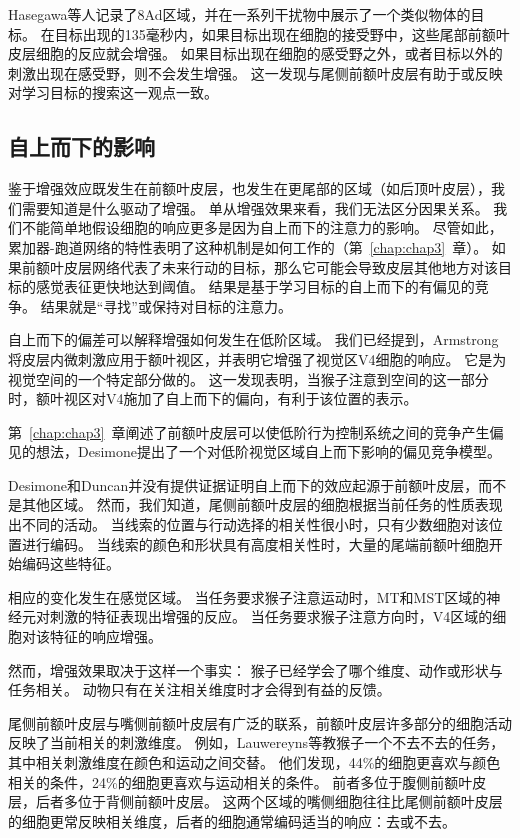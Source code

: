 Hasegawa等人\cite{hasegawa2000search}记录了8Ad区域，并在一系列干扰物中展示了一个类似物体的目标。
在目标出现的135毫秒内，如果目标出现在细胞的接受野中，这些尾部前额叶皮层细胞的反应就会增强。
如果目标出现在细胞的感受野之外，或者目标以外的刺激出现在感受野，则不会发生增强。
这一发现与尾侧前额叶皮层有助于或反映对学习目标的搜索这一观点一致。



\subsection{自上而下的影响}

鉴于增强效应既发生在前额叶皮层，也发生在更尾部的区域（如后顶叶皮层），我们需要知道是什么驱动了增强。
单从增强效果来看，我们无法区分因果关系。
我们不能简单地假设细胞的响应更多是因为自上而下的注意力的影响。
尽管如此，累加器-跑道网络的特性表明了这种机制是如何工作的（第~\ref{chap:chap3}~章）。
如果前额叶皮层网络代表了未来行动的目标，那么它可能会导致皮层其他地方对该目标的感觉表征更快地达到阈值。
结果是基于学习目标的自上而下的有偏见的竞争\cite{desimone1995neural}。
结果就是“寻找”或保持对目标的注意力。


自上而下的偏差可以解释增强如何发生在低阶区域。
我们已经提到，Armstrong\cite{armstrong2007rapid}将皮层内微刺激应用于额叶视区，并表明它增强了视觉区V4细胞的响应。
它是为视觉空间的一个特定部分做的。
这一发现表明，当猴子注意到空间的这一部分时，额叶视区对V4施加了自上而下的偏向，有利于该位置的表示。


第~\ref{chap:chap3}~章阐述了前额叶皮层可以使低阶行为控制系统之间的竞争产生偏见的想法，Desimone\cite{desimone1995neural}提出了一个对低阶视觉区域自上而下影响的偏见竞争模型。


Desimone和Duncan并没有提供证据证明自上而下的效应起源于前额叶皮层，而不是其他区域。
然而，我们知道，尾侧前额叶皮层的细胞根据当前任务的性质表现出不同的活动。
当线索的位置与行动选择的相关性很小时，只有少数细胞对该位置进行编码\cite{chen2001neuronal}。
当线索的颜色和形状具有高度相关性时，大量的尾端前额叶细胞开始编码这些特征\cite{bichot1996visual}。


相应的变化发生在感觉区域。
当任务要求猴子注意运动时，MT和MST区域的神经元对刺激的特征表现出增强的反应\cite{treue1996attentional}。
当任务要求猴子注意方向时，V4区域的细胞对该特征的响应增强\cite{mcadams1999effects}。


然而，增强效果取决于这样一个事实：
猴子已经学会了哪个维度、动作或形状与任务相关。
动物只有在关注相关维度时才会得到有益的反馈。


尾侧前额叶皮层与嘴侧前额叶皮层有广泛的联系，前额叶皮层许多部分的细胞活动反映了当前相关的刺激维度。
例如，Lauwereyns等\cite{lauwereyns2001responses}教猴子一个不去不去的任务，其中相关刺激维度在颜色和运动之间交替。
他们发现，44\%的细胞更喜欢与颜色相关的条件，24\%的细胞更喜欢与运动相关的条件。
前者多位于腹侧前额叶皮层，后者多位于背侧前额叶皮层。
这两个区域的嘴侧细胞往往比尾侧前额叶皮层的细胞更常反映相关维度，后者的细胞通常编码适当的响应：去或不去。



